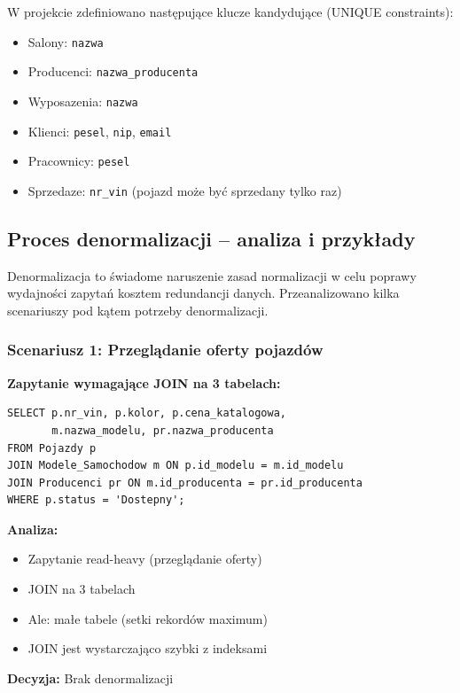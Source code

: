 \documentclass[a4paper,titleauthor]{mwart}
\begin{document}
	W projekcie zdefiniowano następujące klucze kandydujące (UNIQUE constraints):

	\begin{itemize}
		\item Salony: \texttt{nazwa}
		\item Producenci: \texttt{nazwa\_producenta}
		\item Wyposazenia: \texttt{nazwa}
		\item Klienci: \texttt{pesel}, \texttt{nip}, \texttt{email}
		\item Pracownicy: \texttt{pesel}
		\item Sprzedaze: \texttt{nr\_vin} (pojazd może być sprzedany tylko raz)
	\end{itemize}

	\subsection{Proces denormalizacji -- analiza i przykłady}

	Denormalizacja to świadome naruszenie zasad normalizacji w celu poprawy wydajności zapytań kosztem redundancji danych. Przeanalizowano kilka scenariuszy pod kątem potrzeby denormalizacji.

	\subsubsection{Scenariusz 1: Przeglądanie oferty pojazdów}

	\textbf{Zapytanie wymagające JOIN na 3 tabelach:}

	\begin{verbatim}
SELECT p.nr_vin, p.kolor, p.cena_katalogowa,
       m.nazwa_modelu, pr.nazwa_producenta
FROM Pojazdy p
JOIN Modele_Samochodow m ON p.id_modelu = m.id_modelu
JOIN Producenci pr ON m.id_producenta = pr.id_producenta
WHERE p.status = 'Dostepny';
	\end{verbatim}

	\textbf{Analiza:}
	\begin{itemize}
		\item [+] Zapytanie read-heavy (przeglądanie oferty)
		\item [+] JOIN na 3 tabelach
		\item [-] Ale: małe tabele (setki rekordów maximum)
		\item [-] JOIN jest wystarczająco szybki z indeksami
	\end{itemize}

	\textbf{Decyzja:} Brak denormalizacji
\end{document}
